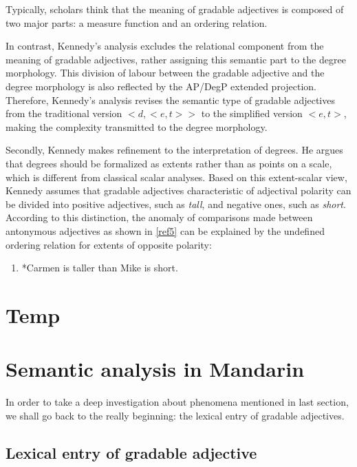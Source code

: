 \documentclass{ctexart}
\let \cite \parencite
\begin{document}
Typically, scholars think that the meaning of gradable adjectives is composed of two major parts: a measure function and an ordering relation\cite{carston2013,horn1992}.

In contrast, Kennedy’s analysis excludes the relational component from the meaning of gradable adjectives, rather assigning this semantic part to the degree morphology. This division of labour between the gradable adjective and the degree morphology is also reflected by the AP/DegP extended projection. Therefore, Kennedy’s analysis revises the semantic type of gradable adjectives from the traditional version $<d,<e,t>>$ to the simplified version $<e,t>$, making the complexity transmitted to the degree morphology.

Secondly, Kennedy makes refinement to the interpretation of degrees. He argues that degrees should be formalized as extents\cite{seuren1978,von1984b,bierwisch1989,lobner2010} rather than as points on a scale, which is different from classical scalar analyses. Based on this extent-scalar view, Kennedy assumes that gradable adjectives characteristic of adjectival polarity can be divided into positive adjectives, such as \textit{tall}, and negative ones, such as \textit{short}. According to this distinction, the anomaly of comparisons made between antonymous adjectives as shown in \ref{ref5} can be explained by the undefined ordering relation for extents of opposite polarity:

\begin{enumerate}[resume]
    \item \label{ref5} *Carmen is taller than Mike is short.
\end{enumerate}

\section{Temp}

\section{Semantic analysis in Mandarin}

In order to take a deep investigation about phenomena mentioned in last section, we shall go back to the really beginning: the lexical entry of gradable adjectives. 

\subsection{Lexical entry of gradable adjective}
\end{document}

